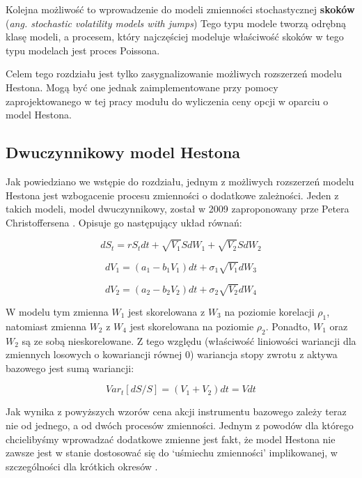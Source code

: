 \documentclass{pracamgr}
\begin{document}
Kolejna możliwość to wprowadzenie do modeli zmienności stochastycznej
\textbf{skoków} (\textit{ang. stochastic volatility models with jumps})
Tego typu modele tworzą odrębną klasę modeli, a procesem, który najczęściej modeluje właściwość
skoków w tego typu modelach jest proces Poissona.

Celem tego rozdziału jest tylko zasygnalizowanie możliwych rozszerzeń modelu Hestona.
Mogą być one jednak zaimplementowane przy pomocy zaprojektowanego w tej pracy modułu 
do wyliczenia ceny opcji w oparciu o model Hestona. 

\subsection{Dwuczynnikowy model Hestona} %
\label{sec:modelDwuczynnikowy}
Jak powiedziano we wstępie do rozdziału, jednym z możliwych rozszerzeń modelu Hestona jest wzbogacenie
procesu zmienności o dodatkowe zależności. 
Jeden z takich modeli, model dwuczynnikowy, został w 2009 zaproponowany prze
Petera Christoffersena   \cite{Christoffersen}.
Opisuje go następujący układ równań:

\begin{equation}
dS_t  = r S_t dt + \sqrt{V_1} S dW_1 + \sqrt{V_2} S dW_2
\end{equation} 

\begin{equation}
dV_1  = (a_1 - b_1 V_1)dt + \sigma_1 \sqrt{V_1} dW_3 
\end{equation}

\begin{equation}
dV_2  = (a_2 - b_2 V_2)dt + \sigma_2 \sqrt{V_2} dW_4 
\end{equation}

W modelu tym zmienna $W_1$ jest skorelowana z $W_3$ na poziomie korelacji $\rho_1$, natomiast
zmienna $W_2$ z $W_4$ jest skorelowana na poziomie $\rho_2$. Ponadto, $W_1$ oraz $W_2$ są ze sobą 
nieskorelowane. Z tego względu (właściwość
liniowości wariancji dla zmiennych losowych o kowariancji równej $0$) wariancja stopy zwrotu z aktywa
bazowego jest sumą wariancji:

\begin{equation}
  Var_t[dS/S] = (V_1 + V_2)dt = Vdt
\end{equation}

Jak wynika z powyższych wzorów cena akcji instrumentu bazowego zależy teraz nie od jednego, a od 
dwóch procesów zmienności.
Jednym z powodów dla którego chcielibyśmy wprowadzać dodatkowe zmienne jest fakt, że model
Hestona nie zawsze jest w stanie dostosować się do `uśmiechu zmienności'  implikowanej, w 
szczególności dla krótkich okresów  \cite{HestonExtensions}.
\end{document}
